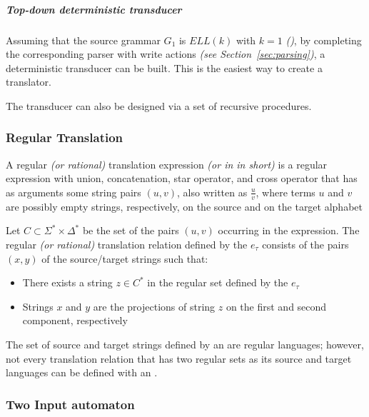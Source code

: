 \documentclass[english]{article}
\begin{document}
\subparagraph*{Top-down deterministic transducer}

Assuming that the source grammar \(G_1\) is \(\textit{ELL}(k)\) with \(k = 1\) \textit{(\ello)}, by completing the corresponding parser with write actions \textit{(see Section~\ref{sec:parsing})}, a deterministic transducer can be built.
This is the easiest way to create a translator.

The transducer can also be designed via a set of recursive procedures.

\subsubsection{Regular Translation}

A regular \textit{(or rational)} translation expression \textit{(or \rte in in short)} is a regular expression with union, concatenation, star operator, and cross operator that has as arguments some string pairs \(\left( u, v \right)\), also written as \(\frac{u}{v}\), where terms \(u\) and \(v\) are possibly empty strings, respectively, on the source and on the target alphabet

\begin{definition}
  \label{def:regular-translation-expression}
  Let \(C \subset \Sigma^\ast \times \Delta^\ast\) be the set of the pairs \(\left( u, v \right)\) occurring in the expression.
  The regular \textit{(or rational)} translation relation defined by the \rte \(e_\tau\) consists of the pairs \(\left( x, y \right)\) of the source/target strings such that:

  \begin{itemize}
    \item There exists a string \(z \in C^\ast\) in the regular set defined by the \rte \(e_\tau\)
    \item Strings \(x\) and \(y\) are the projections of string \(z\) on the first and second component, respectively
  \end{itemize}
\end{definition}

\bigskip
The set of source and target strings defined by an \rte are regular languages;
however, not every translation relation that has two regular sets as its source and target languages can be defined with an \rte.

\subsubsection{Two Input automaton}
\end{document}
